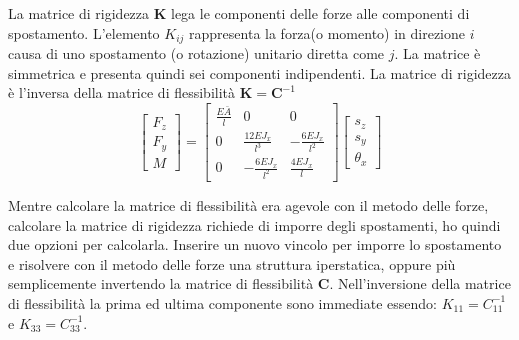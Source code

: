 \begin{definizioneBox}
    La matrice di rigidezza $\boldsymbol{K}$ lega le componenti delle forze alle componenti di spostamento. L'elemento $K_{ij} $ rappresenta la forza(o momento) in direzione $i$ causa di uno spostamento (o rotazione) unitario diretta come $j$. La matrice è simmetrica e presenta quindi sei componenti  indipendenti.
    La matrice di rigidezza è l'inversa della matrice di flessibilità $\boldsymbol{K}  = \boldsymbol{C}^{-1}$
    \begin{equation*}
    \begin{bmatrix}
F_z\\
F_y \\
M
\end{bmatrix}
=
\begin{bmatrix}
\frac{E\bar{A}}{l} & 0 & 0 \\
0 & \frac{12EJ_x}{l^3} & -\frac{6EJ_x}{l^2} \\
0 & -\frac{6EJ_x}{l^2} & \frac{4EJ_x}{l}
\end{bmatrix}
\begin{bmatrix}
s_z \\
s_y \\
\theta_x
\end{bmatrix}
\end{equation*}
\end{definizioneBox}

Mentre calcolare la matrice di flessibilità era agevole con il metodo delle forze, calcolare la matrice di rigidezza richiede di imporre degli spostamenti, ho quindi due opzioni per calcolarla. Inserire un nuovo vincolo per imporre lo spostamento e risolvere con il metodo delle forze una struttura iperstatica, oppure più semplicemente invertendo la matrice di flessibilità $\boldsymbol{C}$. Nell'inversione della matrice di flessibilità la prima ed ultima componente sono immediate essendo: $K_{11} = C_{11}^{-1}$ e $K_{33} = C_{33}^{-1}$.

